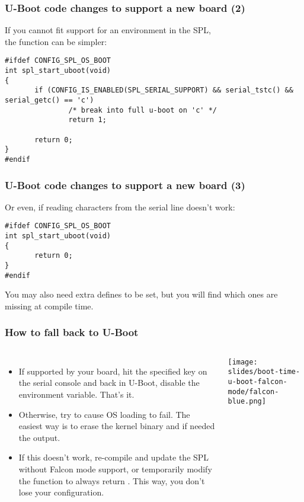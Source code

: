 \begin{frame}[fragile]
\frametitle{U-Boot code changes to support a new board (2)}
If you cannot fit support for an environment in the SPL,\\
the  function can be simpler:
\begin{block}{}
\begin{verbatim}
#ifdef CONFIG_SPL_OS_BOOT
int spl_start_uboot(void)
{
       if (CONFIG_IS_ENABLED(SPL_SERIAL_SUPPORT) && serial_tstc() && serial_getc() == 'c')
               /* break into full u-boot on 'c' */
               return 1;

       return 0;
}
#endif
\end{verbatim}
\end{block}
\end{frame}

\begin{frame}[fragile]
\frametitle{U-Boot code changes to support a new board (3)}
Or even, if reading characters from the serial line doesn't work:
\begin{block}{}
\begin{verbatim}
#ifdef CONFIG_SPL_OS_BOOT
int spl_start_uboot(void)
{
       return 0;
}
#endif
\end{verbatim}
\end{block}
You may also need extra defines to be set, but you will find
which ones are missing at compile time.
\end{frame}

\begin{frame}[fragile]
\frametitle{How to fall back to U-Boot}
   \begin{columns}
   \begin{itemize}
     \item If supported by your board, hit the specified key on the
           serial console and back in U-Boot, disable the 
           environment variable. That's it.
     \item Otherwise, try to cause OS loading to fail. The easiest way
           is to erase the kernel binary and if needed the  output.
     \item If this doesn't work, re-compile and update the SPL without
           Falcon mode support, or temporarily modify the
            function
           to always return . This way, you don't lose your
           configuration.
   \end{itemize}
      \begin{center}
      \texttt{[image: slides/boot-time-u-boot-falcon-mode/falcon-blue.png]}
      \end{center}
   \end{columns}
\end{frame}

